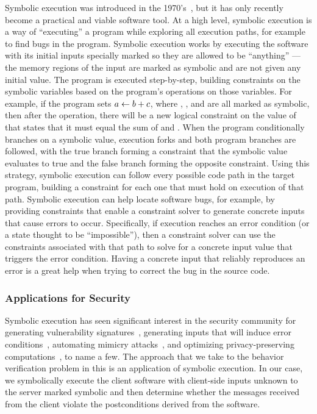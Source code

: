 Symbolic execution was introduced in the
1970's~\cite{boyer75:select,king76:symbex}, but it has only recently
become a practical and viable software tool. At a high level, symbolic
execution is a way of ``executing'' a program while exploring all
execution paths, for example to find bugs in the program.  Symbolic
execution works by executing the software with its initial inputs
specially marked so they are allowed to be ``anything'' --- the memory
regions of the input are marked as symbolic and are not given any
initial value.  The program is executed step-by-step, building
constraints on the symbolic variables based on the program's
operations on those variables.  For example, if the program sets
$a \gets b+c$, where \symbexsum,
\symbexadda, and \symbexaddb are all marked as symbolic, then after
the operation, there will be a new logical constraint on the value of
\symbexsum that states that it must equal the sum of \symbexadda and
\symbexaddb. When the program conditionally branches on a symbolic
value, execution forks and both program branches are followed, with
the true branch forming a constraint that the symbolic value evaluates
to true and the false branch forming the opposite constraint.  Using
this strategy, symbolic execution can follow every possible code path
in the target program, building a constraint for each one that must
hold on execution of that path.
Symbolic execution can help locate software bugs, for example, by
providing constraints that enable a constraint solver to generate
concrete inputs that cause errors to occur.  Specifically, if
execution reaches an error condition (or a state thought to be
``impossible''), then a constraint solver can use the constraints
associated with that path to solve for a concrete input value that
triggers the error condition. Having a concrete input that reliably
reproduces an error is a great help when trying to correct the bug in
the source code.

\subsubsection{Applications for Security}
Symbolic execution has seen significant interest in the
security community for generating vulnerability
signatures~\cite{brumley06:vulnsig,costa07:bouncer}, generating inputs that will
induce error conditions~\cite{cadar06:exe,yang06:maldisks}, automating
mimicry attacks~\cite{kruegel05:mimicry}, and optimizing
privacy-preserving computations~\cite{wang09:genomic}, to name a few.
The approach that we take to the behavior
verification problem in this \dissertation is an application of symbolic
execution.  In our case, we symbolically execute the client software with
client-side inputs unknown to the server marked symbolic and then
determine whether the messages received from the client violate the
postconditions derived from the software. 

